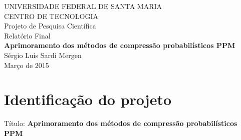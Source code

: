 \documentclass[a4paper,12pt,oneside]{article}
\title{\titulo}
\author{Sérgio Luís Sardi Mergen}
\newcommand{\titulo}{Aprimoramento dos métodos de compressão probabilísticos PPM}
\newcommand{\edital}{nome do edital}
\begin{document}
\begin{titlepage}

\pagestyle{empty}
\begin{center}
\MakeUppercase{Universidade Federal de Santa Maria}\\
\MakeUppercase{Centro de Tecnologia}\\
\vspace*{\fill}
\vspace*{\fill}
\noindent \Large{Projeto de Pesquisa Científica} \\
\noindent \Large{Relatório Final} \\
\vspace*{\fill}
\noindent\Huge{\bf \titulo} \\
\vspace*{\fill}
\noindent \Large{Sérgio Luís Sardi Mergen} \\
\vspace*{\fill}
\normalsize{Março de 2015}
\end{center}

\end{titlepage}

\pagestyle{fancy}

\tableofcontents            %
\newpage





\section{Identificação do projeto}

Título: {\bf \titulo}\\
\end{document}
